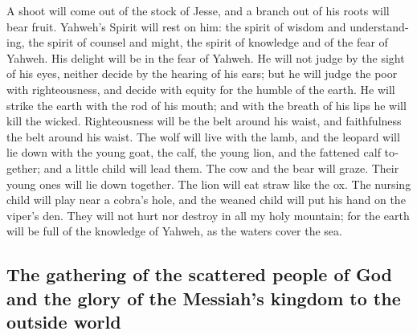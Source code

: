 \begin{paracol}{2}
\begin{otherlanguage}{english}
 A shoot will come out of the stock of Jesse, and a branch
out of his roots will bear fruit.  Yahweh's Spirit will
rest on him: the spirit of wisdom and understanding, the spirit of
counsel and might, the spirit of knowledge and of the fear of Yahweh.
 His delight will be in the fear of Yahweh. He will not
judge by the sight of his eyes, neither decide by the hearing of his
ears;  but he will judge the poor with righteousness, and
decide with equity for the humble of the earth. He will strike the earth
with the rod of his mouth; and with the breath of his lips he will kill
the wicked.  Righteousness will be the belt around his
waist, and faithfulness the belt around his waist.  The
wolf will live with the lamb, and the leopard will lie down with the
young goat, the calf, the young lion, and the fattened calf together;
and a little child will lead them.  The cow and the bear
will graze. Their young ones will lie down together. The lion will eat
straw like the ox.  The nursing child will play near a
cobra's hole, and the weaned child will put his hand on the viper's den.
 They will not hurt nor destroy in all my holy mountain;
for the earth will be full of the knowledge of Yahweh, as the waters
cover the sea.

\hypertarget{the-gathering-of-the-scattered-people-of-god-and-the-glory-of-the-messiahs-kingdom-to-the-outside-world}{%
\subsection{The gathering of the scattered people of God and the glory
of the Messiah's kingdom to the outside
world}\label{the-gathering-of-the-scattered-people-of-god-and-the-glory-of-the-messiahs-kingdom-to-the-outside-world}}


\end{otherlanguage}
\end{paracol}
